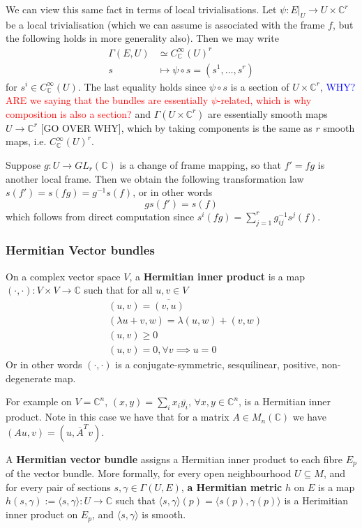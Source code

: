\documentclass[a4paper]{article}
\theoremstyle{definition} \newtheorem*{definition}{Definition}
\theoremstyle{definition} \newtheorem*{definitions}{Definitions}
\theoremstyle{plain} \newtheorem{theorem}{Theorem}[section]
\theoremstyle{plain} \newtheorem{proposition}[theorem]{Proposition}
\theoremstyle{plain} \newtheorem{corollary}[theorem]{Corollary}
\theoremstyle{plain} \newtheorem{lemma}[theorem]{Lemma}
\theoremstyle{plain} \newtheorem{example}[theorem]{Example}
\newcommand{\checkCorrect}[1]{\textcolor{red}{#1}}
\newcommand{\explainFurther}[1]{\textcolor{blue}{#1}}
\newcommand{\defn}[1]{\textbf{#1}}
\newcommand{\complexnos}{\mathbb{C}}
\newcommand{\smoothCmaps}{C^\infty_\complexnos (U)}
\begin{document}
We can view this same fact in terms of local trivialisations.  Let $\psi: E\vert_U \to U\times \complexnos^r$ be a local trivialisation (which we can assume is associated with the frame $f$,  but the following holds in more generality also).  Then we may write
\begin{align*}
\Gamma(E, U) & \simeq \smoothCmaps^r \\
s & \mapsto \psi\circ s = (s^1, \ldots,  s^r)
\end{align*}
for $s^i\in \smoothCmaps$.  
The last equality holds since $\psi\circ s$ is a section of $U\times \complexnos^r$,
\explainFurther{WHY?} 
\checkCorrect{ARE we saying that the bundles are essentially $\psi$-related, which is why composition is also a section?}
and $\Gamma(U\times \complexnos^r)$ are essentially smooth maps $U\to \complexnos^r$ [GO OVER WHY], which by taking components is the same as $r$ smooth maps,  i.e.  $\smoothCmaps^r$.  

Suppose $g:U\to GL_r(\complexnos)$ is a change of frame mapping, so that $f'=fg$ is another local frame. Then we obtain the following transformation law $s(f')=s(fg)=g^{-1}s(f)$, or in other words
$$gs(f')=s(f)$$
which follows from direct computation since $s^i(fg)=\sum_{j=1}^r g_{ij}^{-1} s^j(f)$.

\subsubsection{Hermitian Vector bundles}
On a complex vector space $V$, a \defn{Hermitian inner product} is a map $(\cdot, \cdot):V\times V\to \complexnos$ such that for all $u,v\in V$
\begin{align*}
& (u,v)=\overline{(v, u)} \\
& (\lambda u + v, w) = \lambda (u, w) + (v, w) \\
& (u, v)\geq 0 \\
& (u,v)=0, \forall v \implies u=0
\end{align*}
Or in other words $(\cdot, \cdot)$ is a conjugate-symmetric, sesquilinear, positive, non-degenerate map. 

For example on $V=\complexnos^n$, $(x, y)=\sum_i x_i\overline{y_i}$, $\forall x,y\in \complexnos^n$, is a Hermitian inner product. Note in this case we have that for a matrix $A\in M_n(\complexnos)$ we have $(Au, v)=(u, \overline{A}^Tv)$.

A \defn{Hermitian vector bundle} assigns a Hermitian inner product to each fibre $E_p$ of the vector bundle. More formally, for every open neighbourhood $U\subseteq M$, and for every pair of sections $s, \gamma \in \Gamma(U, E)$, \defn{a Hermitian metric} $h$ on $E$ is a map $h(s, \gamma):=\langle s, \gamma \rangle:U\to \complexnos$ such that $\langle s, \gamma \rangle(p)=\langle s(p), \gamma (p) \rangle$ is a Herimitian inner product on $E_p$, and $\langle s, \gamma \rangle$ is smooth. 
\end{document}
